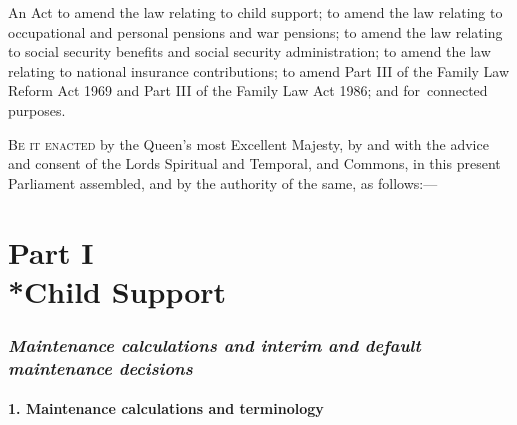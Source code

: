\documentclass[12pt,a4paper]{article}
\title{\regstitle}
\author{2000 Chapter 19}
\date{Royal Assent
28th July 2000\\
}
\begin{document}
\maketitle

{\noindent\large
An Act to amend the law relating to child support; to amend the law relating to occupational and personal pensions and war pensions; to amend the law relating to social security benefits and social security administration; to amend the law relating to national insurance contributions; to amend Part III of the Family Law Reform Act 1969 and Part III of the Family Law Act 1986; and for~connected purposes.

}

\bigskip

\lettrine{B}{e it enacted} by the Queen’s most Excellent Majesty, by and with the advice and consent of the Lords Spiritual and Temporal, and Commons, in this present Parliament assembled, and by the authority of the same, as follows:—  

{\sloppy

\tableofcontents

}

\bigskip



\setcounter{secnumdepth}{-2}

\part[Part I --- Child Support]{Part I\\*Child Support}

\renewcommand\parthead{--- Part I}

\section[\itshape Maintenance calculations and interim and default maintenance decisions]{\itshape\sloppy Maintenance calculations and interim and default maintenance decisions}

\subsection[1. Maintenance calculations and terminology]{1. Maintenance calculations and terminology}
\end{document}
